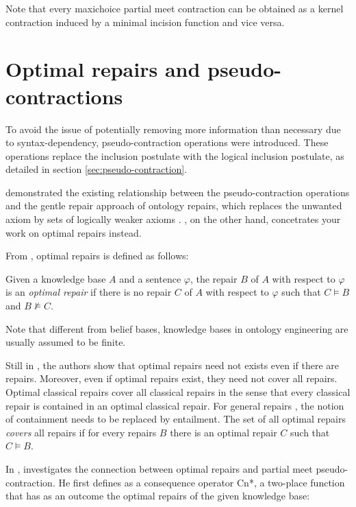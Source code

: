 Note that every maxichoice partial meet contraction can be obtained as a kernel contraction induced by a minimal incision function and vice versa.

\section{Optimal repairs and pseudo-contractions}

To avoid the issue of potentially removing more information than necessary due to syntax-dependency, pseudo-contraction operations were introduced. These operations replace the inclusion postulate with the logical inclusion postulate, as detailed in section \ref{sec:pseudo-contraction}.

\citeauthor{Matos2019} demonstrated the existing relationship between the pseudo-contraction operations and the gentle repair approach of ontology repairs, which replaces the unwanted axiom by sets of logically weaker axioms \citep{Matos2019}. \citeauthor{Baader-SAC23}, on the other hand, concetrates your work \citep{Baader-SAC23} on optimal repairs instead.

From \citet{Baader2018}, optimal repairs is defined as follows:

\begin{definition}
    Given a knowledge base $A$ and a sentence $\varphi$, the repair $B$ of $A$ with respect to $\varphi$ is an \textit{optimal repair} if there is no repair $C$ of $A$ with respect to $\varphi$ such that $C \models B$ and $B \not \models C$.
\end{definition}

Note that different from belief bases, knowledge bases in ontology engineering are usually assumed to be finite.

Still in \citet{Baader2018}, the authors show that optimal repairs need not exists even if there are repairs. Moreover, even if optimal repairs exist, they need not cover all repairs. Optimal classical repairs cover all classical repairs in the sense that every classical repair is contained in an optimal classical repair. For general repairs \citep{Baader-SAC23}, the notion of containment needs to be replaced by entailment. The set of all optimal repairs \textit{covers} all repairs if for every repairs $B$ there is an optimal repair $C$ such that $C \models B$.

In \citet{Baader-SAC23}, \citeauthor{Baader-SAC23} investigates the connection between optimal repairs and partial meet pseudo-contraction. He first defines as a consequence operator \textsf{Cn*}, a two-place function that has as an outcome the optimal repairs of the given knowledge base:

